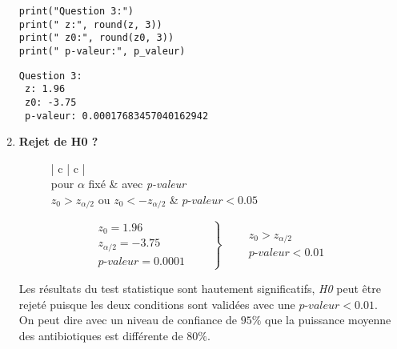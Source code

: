 \begin{enumerate}
\begin{lstlisting}[style=myPython, caption=Code Python question 3, frame=lines]
print("Question 3:")
print(" z:", round(z, 3))
print(" z0:", round(z0, 3))
print(" p-valeur:", p_valeur)
\end{lstlisting}

\begin{lstlisting}[style=myLog, caption=Résultat du code, frame=lines]
Question 3:
 z: 1.96
 z0: -3.75
 p-valeur: 0.00017683457040162942
\end{lstlisting}


    \item \textbf{Rejet de H0 ?}
        \begin{figure}[!h]
            \centering
            \begin{minipage}{.48\linewidth}
                \begin{center}
                    \begin{tabular}{| c | c |}
                        \hline
                         \\
                        pour $\alpha$ fixé & avec \textit{p-valeur} \\ \hline
                        $z_{0} > z_{\alpha/2}$ ou $z_{0} < - z_{\alpha/2}$ & $ \textit{p-valeur} < 0.05 $\\ \hline
                    \end{tabular}
                \end{center}
            \end{minipage}\hfill\vline
            \begin{minipage}{.48\linewidth}
                \begin{equation*}
                    \left .
                    \begin{aligned}
                        z_{0} = 1.96 \\
                        z_{\alpha/2} = -3.75\\
                        \textit{p-valeur} = 0.0001
                    \end{aligned} \qquad
                    \right\} \qquad
                    \begin{aligned} 
                        z_{0} > z_{\alpha/2}\\
                        \textit{p-valeur} < 0.01
                    \end{aligned}
                \end{equation*}
            \end{minipage}
        \end{figure}

        Les résultats du test statistique sont hautement significatifs, \textit{H0} peut être rejeté puisque les deux conditions sont validées avec une $\textit{p-valeur} < 0.01$. \\
        On peut dire avec un niveau de confiance de $95\%$ que la puissance moyenne des antibiotiques est différente de $80\%$.
\end{enumerate}